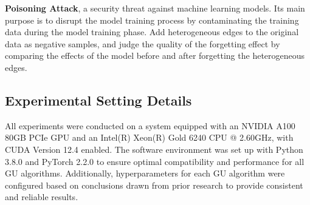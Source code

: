 \textbf{Poisoning Attack}, a security threat against machine learning models. Its main purpose is to disrupt the model training process by contaminating the training data during the model training phase. Add heterogeneous edges to the original data as negative samples, and judge the quality of the forgetting effect by comparing the effects of the model before and after forgetting the heterogeneous edges.

\subsection{Experimental Setting Details}
\label{A.set}
All experiments were conducted on a system equipped with an NVIDIA A100 80GB PCIe GPU and an Intel(R) Xeon(R) Gold 6240 CPU @ 2.60GHz, with CUDA Version 12.4 enabled. The software environment was set up with Python 3.8.0 and PyTorch 2.2.0 to ensure optimal compatibility and performance for all GU algorithms. Additionally, hyperparameters for each GU algorithm were configured based on conclusions drawn from prior research to provide consistent and reliable results.